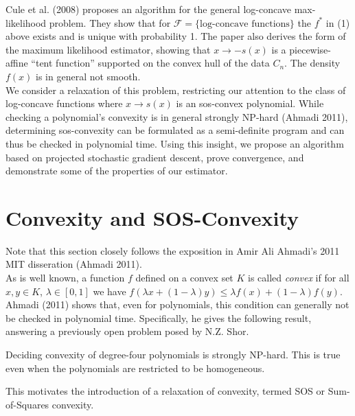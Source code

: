 \documentclass[11pt,reqno]{amsart}
\numberwithin{equation}{section}
\begin{document}
Cule et al. (2008) proposes an algorithm for the general log-concave max-likelihood problem. They show that for $\mathcal{F} = \{\text{log-concave functions}\}$ the $f^*$ in (1) above exists and is unique with probability 1. The paper also derives the form of the maximum likelihood estimator, showing that $x \to -s(x)$ is a piecewise-affine ``tent function'' supported on the convex hull of the data $C_n$. The density $f(x)$ is in general not smooth.\\

We consider a relaxation of this problem, restricting our attention to the class of log-concave functions where $x \to s(x)$ is an sos-convex polynomial. While checking a polynomial's convexity is in general strongly NP-hard (Ahmadi 2011), determining sos-convexity can be formulated as a semi-definite program and can thus be checked in polynomial time. Using this insight, we propose an algorithm based on projected stochastic gradient descent, prove convergence, and demonstrate some of the properties of our estimator. \\

\section{Convexity and SOS-Convexity}

Note that this section closely follows the exposition in Amir Ali Ahmadi's 2011 MIT disseration (Ahmadi 2011). \\

As is well known, a function $f$ defined on a convex set $K$ is called \emph{convex} if for all $x,y \in K$, $\lambda \in [0,1]$ we have $f(\lambda x + (1 - \lambda) y) \leq \lambda f(x) + (1 - \lambda) f(y)$. Ahmadi (2011) shows that, even for polynomials, this condition can generally not be checked in polynomial time. Specifically, he gives the following result, answering a previously open problem posed by N.Z. Shor. \\

\begin{theorem} Deciding convexity of degree-four polynomials is strongly NP-hard. This is true even when the polynomials are restricted to be homogeneous. \\

\end{theorem}

This motivates the introduction of a relaxation of convexity, termed SOS or Sum-of-Squares convexity. \\
\end{document}
